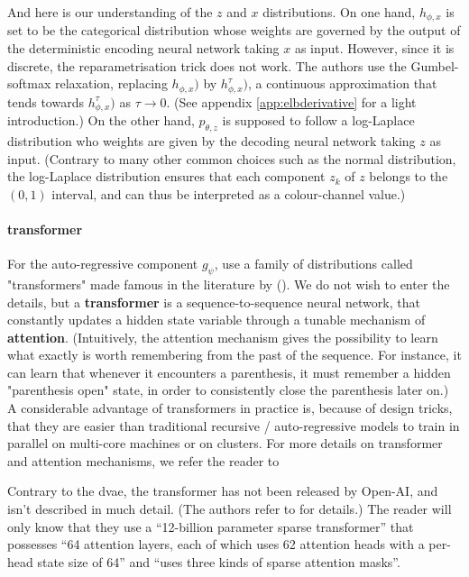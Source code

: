 \documentclass{article}
\begin{document}
\begin{multicols}{2}
And here is our understanding of the $z$ and $x$ distributions. On one hand, $h_{\phi,x}$ is set to be the categorical distribution whose weights are governed by the output of the deterministic encoding neural network taking $x$ as input. However, since it is discrete, the reparametrisation trick does not work. The authors use the Gumbel-softmax relaxation, replacing $h_{\phi,x})$ by $h^\tau_{\phi,x})$, a continuous approximation that tends towards $h^\tau_{\phi,x})$ as $\tau \to 0$.  (See appendix \ref{app:elbderivative} for a light introduction.) On the other hand, $p_{\theta,z}$ is supposed to follow a log-Laplace distribution who weights are given by the decoding neural network taking $z$ as input. (Contrary to many other common choices such as the normal distribution, the log-Laplace distribution ensures that each component $z_k$ of $z$ belongs to the $(0,1)$ interval, and can thus be interpreted as a colour-channel value.)

\paragraph{\Gls{transformer}}

For the auto-regressive component $g_\psi$, \citeauthor{zeroshot} use a family of distributions called "transformers" made famous in the literature by  (\cite{attneed}). We do not wish to enter the details, but a \textbf{transformer} is a sequence-to-sequence neural network, that constantly updates a hidden state variable through a tunable mechanism of \textbf{attention}. (Intuitively, the attention mechanism gives the possibility to learn what exactly is worth remembering from the past of the sequence. For instance, it can learn that whenever it encounters a parenthesis, it must remember a hidden "parenthesis open" state, in order to consistently close the parenthesis later on.)
A considerable advantage of transformers in practice is, because of design tricks, that they are easier than traditional recursive / auto-regressive models to train in parallel on multi-core machines or on clusters. For more details on \gls{transformer} and attention mechanisms, we refer the reader to \cite{illustransfo, attmechanism, yttransfatt}

Contrary to the \gls{dvae}, the transformer has not been released by Open-AI, and isn't described in much detail. (The authors refer to \cite{long-sequences} for details.) The reader will only know that they use a \enquote{12-billion parameter sparse transformer} that possesses \enquote{64 attention layers, each of which uses 62 attention heads with a per-head state size of 64} and \enquote{uses three kinds of sparse attention masks}.


\end{multicols}
\end{document}
